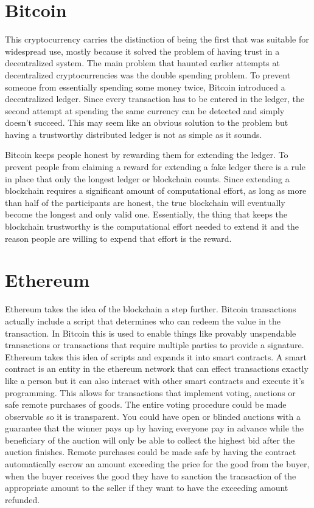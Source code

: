 \section{Bitcoin}

This cryptocurrency carries the distinction of being the first that was
suitable for widespread use, mostly because it solved the problem of having
trust in a decentralized system.
The main problem that haunted earlier attempts at decentralized
cryptocurrencies was the double spending problem.
To prevent someone from essentially spending some money twice, Bitcoin
introduced a decentralized ledger.
Since every transaction has to be entered in the ledger, the second attempt at
spending the same currency can be detected and simply doesn't succeed.
This may seem like an obvious solution to the problem but having a trustworthy
distributed ledger is not as simple as it sounds.

Bitcoin keeps people honest by rewarding them for extending the ledger.
To prevent people from claiming a reward for extending a fake ledger there is a
rule in place that only the longest ledger or blockchain counts.
Since extending a blockchain requires a significant amount of computational
effort, as long as more than half of the participants are honest, the true
blockchain will eventually become the longest and only valid one.
Essentially, the thing that keeps the blockchain trustworthy is the
computational effort needed to extend it and the reason people are willing to
expend that effort is the reward.

\section{Ethereum}

Ethereum takes the idea of the blockchain a step further.
Bitcoin transactions actually include a script that determines who can redeem
the value in the transaction.
In Bitcoin this is used to enable things like provably unspendable transactions
or transactions that require multiple parties to provide a signature.
Ethereum takes this idea of scripts and expands it into smart contracts.
A smart contract is an entity in the ethereum network that can effect
transactions exactly like a person but it can also interact with other smart
contracts and execute it's programming.
This allows for transactions that implement voting, auctions or safe remote
purchases of goods.
The entire voting procedure could be made observable so it is transparent.
You could have open or blinded auctions with a guarantee that the winner pays
up by having everyone pay in advance while the beneficiary of the auction will
only be able to collect the highest bid after the auction finishes.
Remote purchases could be made safe by having the contract automatically escrow
an amount exceeding the price for the good from the buyer, when the buyer
receives the good they have to sanction the transaction of the appropriate
amount to the seller if they want to have the exceeding amount refunded.

